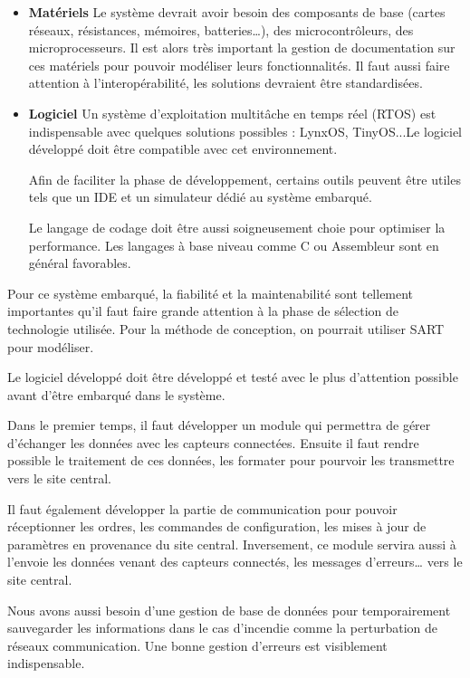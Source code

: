 	\begin{itemize}
	    \item \textbf{Matériels} Le système devrait avoir besoin des composants de base (cartes réseaux, résistances, mémoires, batteries…), des microcontrôleurs, des microprocesseurs. Il est alors très important la gestion de documentation sur ces matériels pour pouvoir modéliser leurs fonctionnalités. Il faut aussi faire attention à l’interopérabilité, les solutions devraient être standardisées.
		\item \textbf{Logiciel} Un système d’exploitation multitâche en temps réel (RTOS) est indispensable avec quelques solutions possibles : LynxOS, TinyOS...Le logiciel développé doit être compatible avec cet environnement. 

		Afin de faciliter  la phase de développement, certains outils peuvent être utiles tels que un IDE et un simulateur dédié au système embarqué.
	
		Le langage de codage doit être aussi soigneusement choie  pour optimiser la performance. Les langages à base niveau comme C ou Assembleur  sont en général favorables.
	\end{itemize}

	Pour ce système embarqué, la fiabilité et la maintenabilité sont tellement importantes qu’il faut faire grande attention à la phase de sélection de technologie utilisée. Pour la méthode de conception, on pourrait utiliser SART pour modéliser.
	 
	Le logiciel développé doit être développé et testé avec le plus d’attention possible avant d’être embarqué dans le système. 
	
		Dans le premier temps, il faut développer un module qui permettra de gérer d’échanger les données avec les capteurs connectées. Ensuite il faut rendre possible le traitement de ces données, les formater pour pourvoir les transmettre vers le site central.
	
	Il faut également développer la partie de communication pour pouvoir réceptionner les ordres, les commandes de configuration, les mises à jour de paramètres en provenance du site central. Inversement, ce module servira aussi à l’envoie les données venant des capteurs connectés, les messages d’erreurs… vers le site central.
	
	Nous avons aussi besoin d’une gestion de base de données pour temporairement sauvegarder les informations dans le cas d’incendie comme la perturbation de réseaux communication. Une bonne gestion d’erreurs est visiblement indispensable. 
